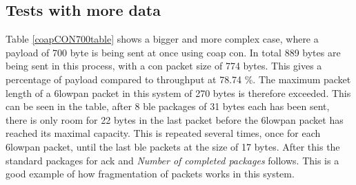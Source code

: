 \subsection{Tests with more data}

\noindent Table \ref{coapCON700table} shows a bigger and more complex case, where a payload of 700 byte is being sent at once using \gls{coap} \gls{con}. In total 889 bytes are being sent in this process, with a \gls{con} packet size of 774 bytes. This gives a percentage of \gls{payload} compared to \gls{throughput} at 78.74 \%. The maximum packet length of a \gls{6lowpan} packet in this system of 270 bytes is therefore exceeded. This can be seen in the table, after 8 \gls{ble} packages of 31 bytes each has been sent, there is only room for 22 bytes in the last packet before the \gls{6lowpan} packet has reached its maximal capacity. This is repeated several times, once for each \gls{6lowpan} packet, until the last \gls{ble} packets at the size of 17 bytes. After this the standard packages for \gls{ack} and \textit{Number of completed packages} follows. This is a good example of how fragmentation of packets works in this system. 



